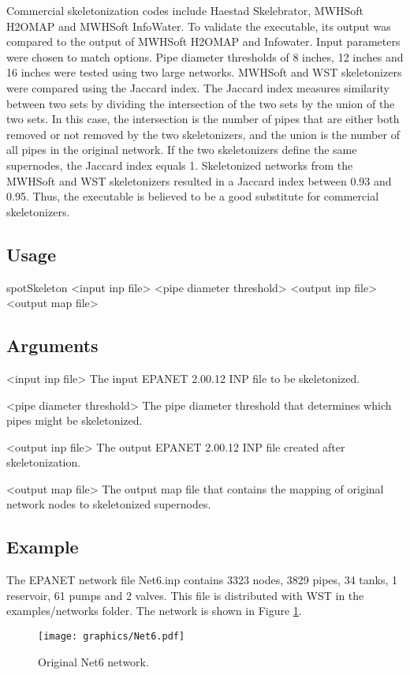 Commercial skeletonization codes include Haestad Skelebrator, MWHSoft 
H2OMAP and MWHSoft InfoWater. 
To validate the  executable, its output was compared to 
the output of MWHSoft H2OMAP and Infowater. Input parameters were chosen to match  
options. Pipe diameter thresholds of 8 inches, 12 inches and 16 inches were 
tested using two large networks. MWHSoft and WST skeletonizers were compared 
using the Jaccard index. The Jaccard index measures similarity 
between two sets by dividing the intersection of the two sets by the union of 
the two sets. In this case, the intersection is the number of pipes that are 
either both removed or not removed by the two skeletonizers, and the union is the 
number of all pipes in the original network. If the two skeletonizers define 
the same supernodes, the Jaccard index equals 1. Skeletonized networks from 
the MWHSoft and WST skeletonizers resulted in a Jaccard index between 0.93 
and 0.95. Thus, the  executable is believed to be a 
good substitute for commercial skeletonizers.  

\subsection{Usage}\label{skelExecutable_skelUsage}
\begin{unknownListing}
   spotSkeleton <input inp file> <pipe diameter threshold> <output inp file> <output map file>
\end{unknownListing}

\subsection{Arguments}\label{skelExecutable_skelArguments}
\begin{unknownListing}
     <input inp file>
     The input EPANET 2.00.12 INP file to be skeletonized.
     
     <pipe diameter threshold>
     The pipe diameter threshold that determines which pipes might be skeletonized.
     
     <output inp file>
     The output EPANET 2.00.12 INP file created after skeletonization.
     
     <output map file>
     The output map file that contains the mapping of original network nodes to 
     skeletonized supernodes.	 
\end{unknownListing}

\subsection{Example}\label{skelExecutable_skelExample}
The EPANET network file Net6.inp contains 
3323 nodes, 3829 pipes, 34 tanks, 1 reservoir, 61 pumps and 2 valves. 
This file is distributed with WST in the examples/networks folder. 
The network is shown in Figure \ref{fig:skelExecutable-origNetwork}. 
\begin{figure}[h]
  \centering
  \texttt{[image: graphics/Net6.pdf]}
  \caption{Original Net6 network.}
  \label{fig:skelExecutable-origNetwork}
\end{figure}

